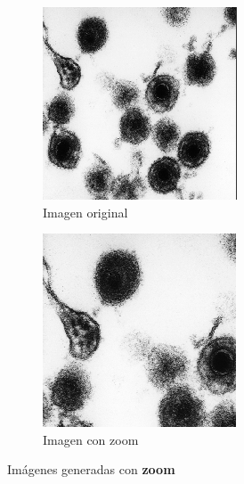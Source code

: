 \documentclass{uc3mpracticas}
\begin{document}
  \begin{figure}[!h]

    \hspace{0.16\textwidth}
    \begin{subfigure}[H]{0.25\textwidth}
      \includegraphics[width=\textwidth, frame]{Images/og.png}
      \caption{Imagen original}
    \end{subfigure}
    \hspace{0.16\textwidth}
    \begin{subfigure}[H]{0.25\textwidth}
      \includegraphics[width=\textwidth, frame]{Images/zoom.png}
      \caption{Imagen con zoom}
    \end{subfigure}

    \caption{Imágenes generadas con \textbf{zoom}}
  \end{figure}
\end{document}
